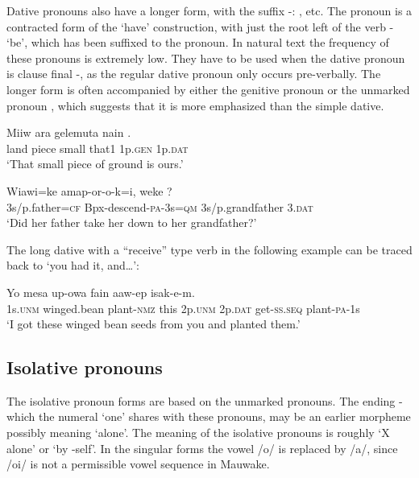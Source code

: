 Dative pronouns also have a longer form, with the suffix -: ,  etc. The pronoun is a contracted form of the `have' construction, with just the root left of the verb - `be', which has been suffixed to the pronoun. In natural text the frequency of these pronouns is extremely low. They have to be used when the dative pronoun is clause final -, as the regular dative pronoun only occurs pre-verbally. The longer form is often accompanied by either the genitive pronoun  or the unmarked pronoun , which suggests that it is more emphasized than the simple dative.

\ea%
\label{ex:3:x597}
\gll Miiw ara gelemuta nain  . \\
land piece small that1 1p.\textsc{gen} 1p.\textsc{dat}\\
\glt`That small piece of ground is ours.'
\z

\ea%
\label{ex:3:x598}
\gll Wiawi=ke amap-or-o-k=i, weke ? \\
3s/p.father=\textsc{cf} Bpx-descend-\textsc{pa}-3s=\textsc{qm} 3s/p.grandfather 3.\textsc{dat}\\
\glt`Did her father take her down to her grandfather?'
\z

The long dative with a ``receive'' type verb in the following example can be traced back to  `you had it, and{\dots}':

\ea%
\label{ex:3:x596}
\gll Yo mesa up-owa fain   aaw-ep isak-e-m.\\
1s.\textsc{unm} winged.bean plant-\textsc{nmz} this 2p.\textsc{unm} 2p.\textsc{dat} get-\textsc{ss}.\textsc{seq} plant-\textsc{pa}-1s\\
\glt`I got these winged bean seeds from you and planted them.'
\z

\subsection{Isolative pronouns}\label{sec:3:y:x}
{}
The isolative pronoun forms are based on the unmarked pronouns. The ending \nobreakdash-\textstyleStyleVernacularWordsItalic{,} which the numeral  `one' shares with these pronouns, may be an earlier morpheme possibly meaning `alone'. The meaning of the isolative pronouns is roughly `X alone' or `by -self'. In the singular forms the vowel /o/ is replaced by /a/, since /oi/ is not a permissible vowel sequence in Mauwake. 

